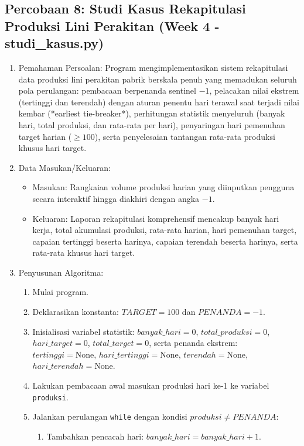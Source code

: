 \documentclass[12pt,a4paper]{article}
\begin{document}
\subsection{Percobaan 8: Studi Kasus Rekapitulasi Produksi Lini Perakitan (Week 4 - studi\_kasus.py)}
\begin{enumerate}
    \item Pemahaman Persoalan: Program mengimplementasikan sistem rekapitulasi data produksi lini perakitan pabrik berskala penuh yang memadukan seluruh pola perulangan: pembacaan berpenanda sentinel $-1$, pelacakan nilai ekstrem (tertinggi dan terendah) dengan aturan penentu hari terawal saat terjadi nilai kembar (*earliest tie-breaker*), perhitungan statistik menyeluruh (banyak hari, total produksi, dan rata-rata per hari), penyaringan hari pemenuhan target harian ($\ge 100$), serta penyelesaian tantangan rata-rata produksi khusus hari target.
    \item Data Masukan/Keluaran:
    \begin{itemize}
        \item Masukan: Rangkaian volume produksi harian yang diinputkan pengguna secara interaktif hingga diakhiri dengan angka $-1$.
        \item Keluaran: Laporan rekapitulasi komprehensif mencakup banyak hari kerja, total akumulasi produksi, rata-rata harian, hari pemenuhan target, capaian tertinggi beserta harinya, capaian terendah beserta harinya, serta rata-rata khusus hari target.
    \end{itemize}
    \item Penyusunan Algoritma:
    \begin{enumerate}[label=\alph*.]
        \item Mulai program.
        \item Deklarasikan konstanta: $TARGET = 100$ dan $PENANDA = -1$.
        \item Inisialisasi variabel statistik: $banyak\_hari = 0$, $total\_produksi = 0$, $hari\_target = 0$, $total\_target = 0$, serta penanda ekstrem: $tertinggi = \text{None}$, $hari\_tertinggi = \text{None}$, $terendah = \text{None}$, $hari\_terendah = \text{None}$.
        \item Lakukan pembacaan awal masukan produksi hari ke-1 ke variabel \texttt{produksi}.
        \item Jalankan perulangan \texttt{while} dengan kondisi $produksi \ne PENANDA$:
        \begin{enumerate}[label=\roman*.]
            \item Tambahkan pencacah hari: $banyak\_hari = banyak\_hari + 1$.

\end{enumerate}
\end{enumerate}
\end{enumerate}
\end{document}
